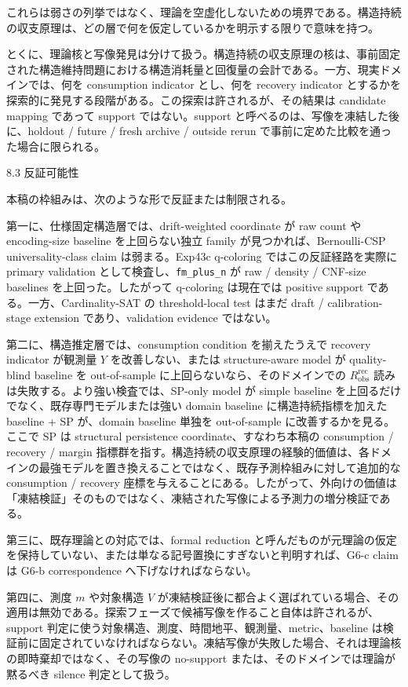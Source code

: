 \documentclass[12pt,a4paper]{article}
\begin{document}
これらは弱さの列挙ではなく、理論を空虚化しないための境界である。構造持続の収支原理は、どの層で何を仮定しているかを明示する限りで意味を持つ。

とくに、理論核と写像発見は分けて扱う。構造持続の収支原理の核は、事前固定された構造維持問題における構造消耗量と回復量の会計である。一方、現実ドメインでは、何を consumption indicator とし、何を recovery indicator とするかを探索的に発見する段階がある。この探索は許されるが、その結果は candidate mapping であって support ではない。support と呼べるのは、写像を凍結した後に、holdout / future / fresh archive / outside rerun で事前に定めた比較を通った場合に限られる。

8.3 反証可能性

本稿の枠組みは、次のような形で反証または制限される。

第一に、仕様固定構造層では、drift-weighted coordinate が raw count や encoding-size baseline を上回らない独立 family が見つかれば、Bernoulli-CSP universality-class claim は弱まる。Exp43c q-coloring ではこの反証経路を実際に primary validation として検査し、\texttt{fm\_plus\_n} が raw / density / CNF-size baselines を上回った。したがって q-coloring は現在では positive support である。一方、Cardinality-SAT の threshold-local test はまだ draft / calibration-stage extension であり、validation evidence ではない。

第二に、構造推定層では、consumption condition を揃えたうえで recovery indicator が観測量 \(Y\) を改善しない、または structure-aware model が quality-blind baseline を out-of-sample に上回らないなら、そのドメインでの \(R_{\mathrm{obs}}^{\mathrm{rec}}\) 読みは失敗する。より強い検査では、SP-only model が simple baseline を上回るだけでなく、既存専門モデルまたは強い domain baseline に構造持続指標を加えた baseline + SP が、domain baseline 単独を out-of-sample に改善するかを見る。ここで SP は structural persistence coordinate、すなわち本稿の consumption / recovery / margin 指標群を指す。構造持続の収支原理の経験的価値は、各ドメインの最強モデルを置き換えることではなく、既存予測枠組みに対して追加的な consumption / recovery 座標を与えることにある。したがって、外向けの価値は「凍結検証」そのものではなく、凍結された写像による予測力の増分検証である。

第三に、既存理論との対応では、formal reduction と呼んだものが元理論の仮定を保持していない、または単なる記号置換にすぎないと判明すれば、G6-c claim は G6-b correspondence へ下げなければならない。

第四に、測度 \(m\) や対象構造 \(V\) が凍結検証後に都合よく選ばれている場合、その適用は無効である。探索フェーズで候補写像を作ること自体は許されるが、support 判定に使う対象構造、測度、時間地平、観測量、metric、baseline は検証前に固定されていなければならない。凍結写像が失敗した場合、それは理論核の即時棄却ではなく、その写像の no-support または、そのドメインでは理論が黙るべき silence 判定として扱う。
\end{document}
